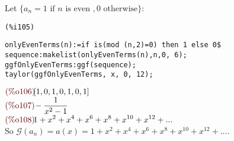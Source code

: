 Let $\{a_n = 1 \text{ if } n \text{ is even }, 0 \text{ otherwise}\}$:\\
\noindent
\begin{minipage}[t]{8ex}{\color{red}\bf
\begin{verbatim}
(%i105) 
\end{verbatim}}
\end{minipage}
\begin{minipage}[t]{\textwidth}{\color{blue}
\begin{verbatim}
onlyEvenTerms(n):=if is(mod (n,2)=0) then 1 else 0$
sequence:makelist(onlyEvenTerms(n),n,0, 6);
ggfOnlyEvenTerms:ggf(sequence);
taylor(ggfOnlyEvenTerms, x, 0, 12);
\end{verbatim}}
\end{minipage}
\begin{math}\displaystyle
\parbox{8ex}{\color{labelcolor}(\%o106) }
[1,0,1,0,1,0,1]
\end{math}\\
\begin{math}\displaystyle
\parbox{8ex}{\color{labelcolor}(\%o107) }
-\frac{1}{{x}^{2}-1}
\end{math}\\
\begin{math}\displaystyle
\parbox{8ex}{\color{labelcolor}(\%o108) }
1+{x}^{2}+{x}^{4}+{x}^{6}+{x}^{8}+{x}^{10}+{x}^{12}+...
\end{math}\\
So $\mathcal{G}(a_n) =
a(x)=1+{x}^{2}+{x}^{4}+{x}^{6}+{x}^{8}+{x}^{10}+{x}^{12}+...$.\\

